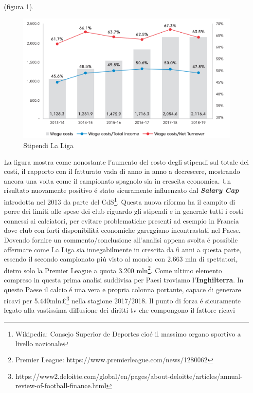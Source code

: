 \documentclass[
    corpo=12pt,
    oneside,
    evenboxes,
    tipotesi=triennale,
    stile=classica,
    oldstyle,
    autoretitolo,
    greek,
]{toptesi}
\begin{document}
\begin{interlinea}{1.5}
(figura \ref{wage_spain}).
\begin{figure}
    \centering
    \includegraphics[scale=.5]{img/wage_spain.png}
    \caption{Stipendi La Liga}
    \label{wage_spain}
\end{figure}
La figura mostra come nonostante l'aumento del costo degli stipendi sul totale dei costi, il rapporto con il fatturato vada di anno in anno
a decrescere, mostrando ancora una volta come il campionato spagnolo sia in crescita economica. Un risultato nuovamente positivo \'e stato
sicuramente influenzato dal \emph{\textbf{Salary Cap}} introdotta nel 2013 da parte del CdS\footnote{Wikipedia: Consejo Superior de Deportes cio\'e il massimo organo sportivo a livello nazionale}.
Questa nuova riforma ha il campito di porre dei limiti alle spese dei club riguardo gli stipendi e in generale tutti i costi connessi ai calciatori,
per evitare problematiche presenti ad esempio in Francia dove club con forti disponibilit\'a economiche gareggiano incontrastati nel Paese.\newline
Dovendo fornire un commento/conclusione all'analisi appena svolta \'e possibile affermare come La Liga sia innegabilmente in crescita da 6 
anni a questa parte, essendo il secondo campionato pi\'u visto al mondo con 2.663 mln di spettatori, dietro solo la Premier League a quota 
3.200 mln\footnote{Premier League: https://www.premierleague.com/news/1280062}.\newline
Come ultimo elemento compreso in questa prima analisi suddivisa per Paesi \linebreak troviamo l'\textbf{Inghilterra}. In questo Paese il calcio 
\'e una vera e propria colonna portante, capace di generare ricavi per 5.440mln£\footnote{https://www2.deloitte.com/global/en/pages/about-deloitte/articles/annual-review-of-football-finance.html}
nella stagione 2017/2018. Il punto di forza \'e sicuramente legato alla vastissima diffusione dei diritti tv che compongono il fattore ricavi

\end{interlinea}
\end{document}

